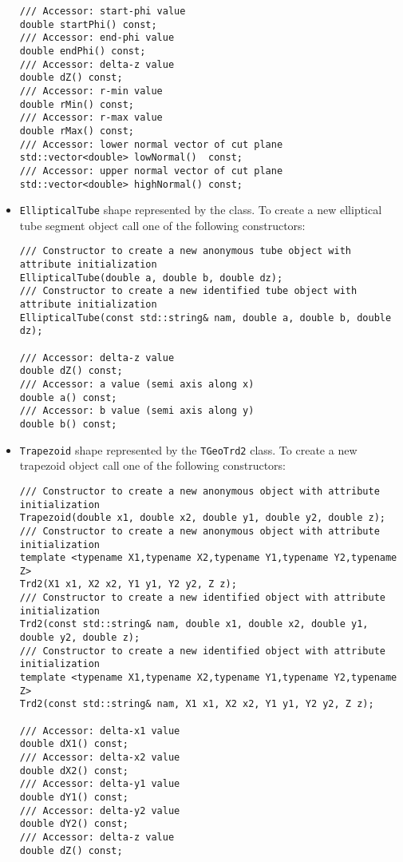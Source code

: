 \begin{itemize}
\begin{verbatim}
/// Accessor: start-phi value
double startPhi() const;
/// Accessor: end-phi value
double endPhi() const;
/// Accessor: delta-z value
double dZ() const;
/// Accessor: r-min value
double rMin() const;
/// Accessor: r-max value
double rMax() const;
/// Accessor: lower normal vector of cut plane
std::vector<double> lowNormal()  const;
/// Accessor: upper normal vector of cut plane
std::vector<double> highNormal() const;
\end{verbatim}

\item \texttt{EllipticalTube} shape represented by the  class.
To create a new elliptical tube segment object call one of the following constructors:
\begin{verbatim}
/// Constructor to create a new anonymous tube object with attribute initialization
EllipticalTube(double a, double b, double dz);
/// Constructor to create a new identified tube object with attribute initialization
EllipticalTube(const std::string& nam, double a, double b, double dz);

/// Accessor: delta-z value
double dZ() const;
/// Accessor: a value (semi axis along x)
double a() const;
/// Accessor: b value (semi axis along y)
double b() const;
\end{verbatim}

\item \texttt{Trapezoid} shape represented by the \texttt{TGeoTrd2} class. To create a new trapezoid object call one of the following constructors:
\begin{verbatim}
/// Constructor to create a new anonymous object with attribute initialization
Trapezoid(double x1, double x2, double y1, double y2, double z);
/// Constructor to create a new anonymous object with attribute initialization
template <typename X1,typename X2,typename Y1,typename Y2,typename Z>
Trd2(X1 x1, X2 x2, Y1 y1, Y2 y2, Z z);
/// Constructor to create a new identified object with attribute initialization
Trd2(const std::string& nam, double x1, double x2, double y1, double y2, double z);
/// Constructor to create a new identified object with attribute initialization
template <typename X1,typename X2,typename Y1,typename Y2,typename Z>
Trd2(const std::string& nam, X1 x1, X2 x2, Y1 y1, Y2 y2, Z z);

/// Accessor: delta-x1 value
double dX1() const;
/// Accessor: delta-x2 value
double dX2() const;
/// Accessor: delta-y1 value
double dY1() const;
/// Accessor: delta-y2 value
double dY2() const;
/// Accessor: delta-z value
double dZ() const;
\end{verbatim}


\end{itemize}
